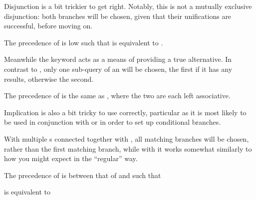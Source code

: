 Disjunction is a bit trickier to get right. Notably, this is not a mutually
exclusive disjunction: both branches will be chosen, given that their unifications
are successful, before moving on.

The precedence of  is low such that 
is equivalent to .

\begin{prooftree}
\end{prooftree}

\begin{prooftree}
\end{prooftree}

Meanwhile the  keyword acts as a means of providing a true alternative.
In contrast to , only one sub-query of an  will be chosen, the
first if it has any results, otherwise the second.

The precedence of  is the same as , where the two are each left
associative.

\begin{prooftree}
\end{prooftree}

\begin{prooftree}
\end{prooftree}

Implication is also a bit tricky to use correctly, particular as it is most likely
to be used in conjunction with  or  in order to set up conditional
branches.

With multiple s connected together with , all matching branches will
be chosen, rather than the first matching branch, while with  it works
somewhat similarly to how you might expect in the ``regular'' way.

The precedence of  is between that of  and  such that

\begin{center}
\end{center}

is equivalent to

\begin{center}
\end{center}

